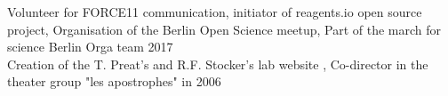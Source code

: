 Volunteer for FORCE11 communication,
initiator of reagents.io open source project,
Organisation of the Berlin Open Science meetup,
Part of the march for science Berlin Orga team 2017\\
Creation of the T. Preat's and R.F. Stocker's lab website
,
Co-director in the theater group "les apostrophes" in
2006


%
%
%
%
%
%
%
%
%
